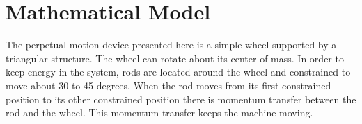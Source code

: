 \documentclass[]{aiaa-tc} %
\begin{document}


\section{Mathematical Model}

The perpetual motion device presented here is a simple wheel supported by a
triangular structure. The wheel can rotate about its center of
mass. In order to keep energy in the system, rods are located around
the wheel and constrained to move about 30 to 45 degrees. When the rod
moves from its first constrained position to its other constrained
position there is momentum transfer between the rod and the
wheel. This momentum transfer keeps the machine moving.
\end{document}

